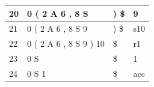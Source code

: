 \documentclass{article}
\begin{document}
\begin{latin}
\begin{table}[H]
\begin{tabular}{|llll|}
\multicolumn{1}{|l|}{20}            & \multicolumn{1}{l|}{{\color[HTML]{0000FF} 0 ( 2 A 6 , 8 S}}        & \multicolumn{1}{l|}{) \$}             & {\color[HTML]{0000FF} 9}             \\ \hline
\multicolumn{1}{|l|}{21}            & \multicolumn{1}{l|}{{\color[HTML]{0000FF} 0 ( 2 A 6 , 8 S 9}}      & \multicolumn{1}{l|}{) \$}             & s10                                  \\ \hline
\multicolumn{1}{|l|}{22}            & \multicolumn{1}{l|}{{\color[HTML]{0000FF} 0 ( 2 A 6 , 8 S 9 ) 10}} & \multicolumn{1}{l|}{\$}               & r1                                   \\ \hline
\multicolumn{1}{|l|}{23}            & \multicolumn{1}{l|}{{\color[HTML]{0000FF} 0 S}}                    & \multicolumn{1}{l|}{\$}               & {\color[HTML]{0000FF} 1}             \\ \hline
\multicolumn{1}{|l|}{24}            & \multicolumn{1}{l|}{{\color[HTML]{0000FF} 0 S 1}}                  & \multicolumn{1}{l|}{\$}               & {\color[HTML]{008000} acc}           \\ \hline
\end{tabular}
\end{table}
\end{latin}



\end{document}
